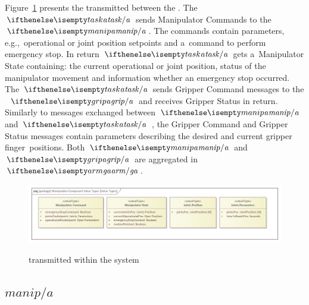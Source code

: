 \documentclass[11pt,oneside,a4paper]{article}
\newcommand{\Figure}[0]{Figure}
\begin{document}
	\Figure{}~\ref{fig:sys_messages} presents the \ValueTypes{} transmitted between the \Agents{}. The \TaskAgent{} $\ea{task}$ sends Manipulator Commands to the
	\ManipulatorAgent{} $\ea{manip}$. The commands contain parameters, e.g.,\ operational or joint position setpoints and a~command to perform emergency stop.
	In return $\ea{task}$ gets a~Manipulator State \ValueType{} containing: the current operational or joint position, status of the manipulator movement and information
	whether an emergency stop occurred.
	The \TaskAgent{} $\ea{task}$ sends Gripper Command messages to the \GripperAgent{}~$\ea{grip}$ and receives Gripper Status in return.
	Similarly to messages exchanged between $\ea{manip}$ and $\ea{task}$ \Agents, the Gripper Command and Gripper Status messages contain parameters describing
	the desired and current gripper finger~positions. Both $\ea{manip}$ and $\ea{grip}$ are aggregated in \GroupofAgents{} $\ega{arm}$.
	
	\begin{figure}[H]
		\centering
		\begin{center}
			{\includegraphics[width=\columnwidth]{img/value_types/manipulator_compound_value_types.png}}
		\end{center}
		\caption{\ValueTypes{} transmitted within the system}
		\label{fig:sys_messages}
	\end{figure}
	
	\subsection{\ManipulatorAgent{} $manip/a$}
	
\end{document}
